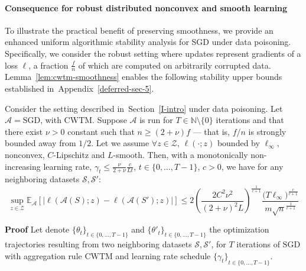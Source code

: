 \documentclass[twoside,11pt]{article}
\newcommand\mc{\mathcal}
\newcommand\mb{\mathbb}
\begin{document}
\paragraph{Consequence for robust distributed nonconvex and smooth learning}\label{sec3.3-noncvx}
To illustrate the practical benefit of preserving smoothness, we provide an enhanced uniform algorithmic stability analysis for SGD under data poisoning.
Specifically, we consider the robust setting where updates represent gradients of a loss $\ell$, a fraction $\frac{f}{n}$ of which are computed on arbitrarily corrupted data.
Lemma~\ref{lem:cwtm-smoothness} enables the following stability upper bounds established in~Appendix~\ref{deferred-sec-5}.
\begin{theorem}\label{poi-cwtm-ub}
    Consider the setting described in~Section~\ref{I-intro} under data poisoning.
    Let $\mc{A}=\mathrm{SGD}$, with $\mathrm{CWTM}$. Suppose $\mc{A}$ is run for $T\in\mb{N} \setminus \{0\}$ iterations and that there exist $\nu>0$ constant such that $n\geq (2+\nu)f$ --- that is, $f/n$ is strongly bounded away from $1/2$.
    Let we assume $\forall z \in \mc{Z}$, $\ell(\cdot;z)$ bounded by $\ell_\infty$, nonconvex, $C$-Lipschitz and $L$-smooth.
    Then, with a monotonically non-increasing learning rate, $\gamma_t \leq \frac{\nu}{2+\nu}\frac{c}{Lt}$, $t \in \{0, \ldots, T-1\}$, $c>0$,
    we have for any neighboring datasets $\mc{S}, \mc{S'}$:
    \begin{equation}\label{ub-noncvx-pois3}
        \sup_{z \in \mathcal{Z}} \mb{E}_{\mc{A}}[ | \ell(\mc{A}(S);z) - \ell(\mc{A}(S');z) | ] 
        \leq 2 {\left( \frac{2 C^2 \nu^2}{{(2+\nu)}^2 L} \right)}^{\frac{1}{c+1}} \frac{{\big(T \ell_\infty \big)}^{\frac{c}{c+1}}}{m{\sqrt{n}}^{\frac{1}{c+1}}}
    \end{equation}
\end{theorem}
\textbf{Proof}\;
    Let denote $\{{\theta_t\}}_{t \in \{0, \ldots, T-1\}}$ and ${\{\theta'_t\}}_{t \in \{0, \ldots, T-1\}}$ the optimization trajectories resulting from two neighboring datasets $\mc{S}, \mc{S}'$, for $T$ iterations of $\mathrm{SGD}$ with aggregation rule $\mathrm{CWTM}$ and learning rate schedule ${\{ \gamma_t \}}_{t \in \{0, \ldots, T-1\}}$. 
\end{document}
